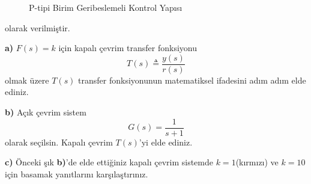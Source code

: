 \begin{figure}[!h]
	\centering
	\caption{P-tipi Birim Geribeslemeli Kontrol Yapısı}
	\label{fig:PTipiKontrolBlokDiyagrami}
\end{figure}
olarak verilmiştir.

\noindent\textbf{a)} $F(s)=k$ için kapalı çevrim transfer fonksiyonu
\begin{equation*}
	T(s)\triangleq \frac{y(s)}{r(s)}
\end{equation*}
olmak üzere $T(s)$ transfer fonksiyonunun matematiksel ifadesini adım adım elde ediniz.

\noindent\textbf{b)} Açık çevrim sistem
\begin{equation}
	G(s)=\frac{1}{s+1}
\end{equation}
olarak seçilsin. Kapalı çevrim $T(s)$'yi elde ediniz.

\noindent\textbf{c)} Önceki şık \noindent\textbf{b)}'de elde ettiğiniz kapalı çevrim sistemde $k=1$(kırmızı) ve $k=10$ için basamak yanıtlarını karşılaştırınız.
